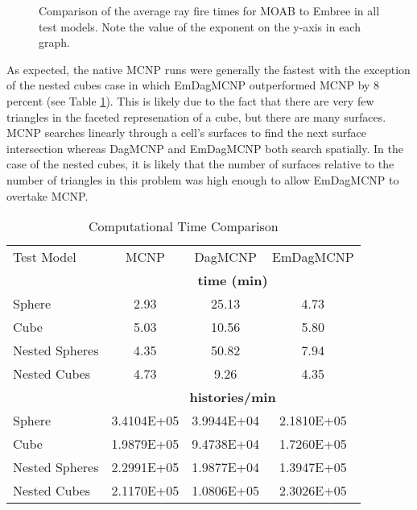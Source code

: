 \documentclass{anstrans}
\begin{document}
\begin{figure}[H]

  \begin{center}
    
    \caption{Comparison of the average ray fire times for MOAB to Embree in all test models. Note the value of the exponent on the y-axis in each graph.}
    
  \end{center}

\end{figure}

As expected, the native MCNP runs were generally the fastest with the exception of the nested cubes case in which EmDagMCNP outperformed MCNP by 8 percent (see Table \ref{timings}). This is likely due to the fact that there are very few triangles in the faceted represenation of a cube, but there are many surfaces. MCNP searches linearly through a cell's surfaces to find the next surface intersection whereas DagMCNP and EmDagMCNP both search spatially. In the case of the nested cubes, it is likely that the number of surfaces relative to the number of triangles in this problem was high enough to allow EmDagMCNP to overtake MCNP.

\begin{table}
  \small
  \begin{center}

      \caption{Computational Time Comparison}
      \label{timings}
    \begin{tabular}{lccc}



      \toprule
      Test Model & MCNP & DagMCNP & EmDagMCNP \\
      & \multicolumn{3}{c}{\textbf{time (min)}} \\
      \hline
      Sphere & 2.93 & 25.13 & 4.73  \\
      Cube & 5.03 & 10.56  & 5.80 \\
      Nested Spheres & 4.35 & 50.82 & 7.94 \\
      Nested Cubes & 4.73 & 9.26 & 4.35 \\
      &  \multicolumn{3}{c}{\textbf{histories/min}} \\
      \hline
      Sphere & 3.4104E+05  & 3.9944E+04  & 2.1810E+05   \\
      Cube & 1.9879E+05 & 9.4738E+04 & 1.7260E+05 \\
      Nested Spheres & 2.2991E+05 & 1.9877E+04 & 1.3947E+05 \\
      Nested Cubes & 2.1170E+05 & 1.0806E+05 & 2.3026E+05 \\
      \bottomrule
      
    \end{tabular}
  \end{center}
\end{table}
\end{document}
